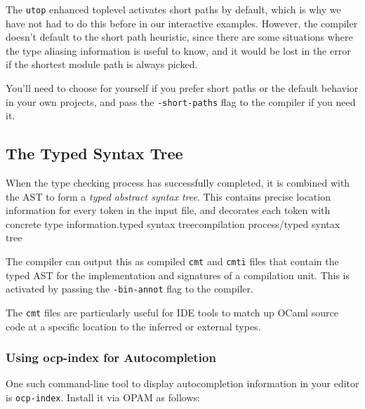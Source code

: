 The \passthrough{\lstinline!utop!} enhanced toplevel activates short
paths by default, which is why we have not had to do this before in our
interactive examples. However, the compiler doesn't default to the short
path heuristic, since there are some situations where the type aliasing
information is useful to know, and it would be lost in the error if the
shortest module path is always picked.

You'll need to choose for yourself if you prefer short paths or the
default behavior in your own projects, and pass the
\passthrough{\lstinline!-short-paths!} flag to the compiler if you need
it.~

\hypertarget{the-typed-syntax-tree}{%
\subsection{The Typed Syntax Tree}\label{the-typed-syntax-tree}}

When the type checking process has successfully completed, it is
combined with the AST to form a \emph{typed abstract syntax tree}. This
contains precise location information for every token in the input file,
and decorates each token with concrete type
information.\protect\hypertarget{typesyntree}{}{typed syntax
tree}\protect\hypertarget{CPtypsyn}{}{compilation process/typed syntax
tree}

The compiler can output this as compiled \passthrough{\lstinline!cmt!}
and \passthrough{\lstinline!cmti!} files that contain the typed AST for
the implementation and signatures of a compilation unit. This is
activated by passing the \passthrough{\lstinline!-bin-annot!} flag to
the compiler.

The \passthrough{\lstinline!cmt!} files are particularly useful for IDE
tools to match up OCaml source code at a specific location to the
inferred or external types.

\hypertarget{using-ocp-index-for-auto-completion}{%
\subsubsection{Using ocp-index for
Autocompletion}\label{using-ocp-index-for-auto-completion}}

One such command-line tool to display autocompletion information in your
editor is \passthrough{\lstinline!ocp-index!}. Install it via OPAM as
follows:

